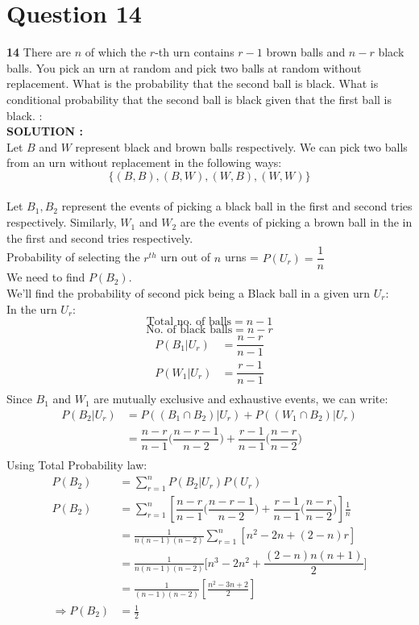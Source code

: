 \documentclass{article}
\begin{document}
\section{Question 14}
\label{Q14}
\textbf{14} There are $n$ of which the $r$-th urn contains $r - 1$ brown balls and $n - r$ black balls. You pick an urn at random and pick two balls at random without replacement. What is the probability that the second ball is black. What is conditional probability that the second ball is black given that the first ball is black.  : \\


\hspace{1em} \large{\textbf{SOLUTION :}} \\
    Let $B$ and $W$ represent black and brown balls respectively.
    We can pick two balls from an urn without replacement in the following ways:\\ 
    $$\{(B,B),(B,W),(W,B),(W,W)\}$$\\
    Let $B_1,B_2$ represent the events of picking a black ball in the first and second tries respectively. Similarly, ${W_1}$ and ${W_2}$ are the events of picking a brown ball in the in the first and second tries respectively.\\
    Probability of selecting the $r^{th}$ urn out of $n$ urns = $P(U_r)=\dfrac{1}{n}$\\
    We need to find $P(B_2)$.\\
    We'll find the probability of second pick being a Black ball in a given urn $U_r$:\\
    In the urn $U_r$:\\
    $$\text{Total no. of balls} = n-1$$
    $$\text{No. of black balls} = n-r$$
\begin{align*}
    P(B_1|U_r)&=\dfrac{n-r}{n-1}\\
    P(W_1|U_r)&=\dfrac{r-1}{n-1}\\
\end{align*}
    Since $B_1$ and $W_1$ are mutually exclusive and exhaustive events, we can write:
\begin{align}
    P(B_2|U_r)&=P((B_1\cap B_2)|U_r) + P((W_1\cap B_2)|U_r)\\
    &=\dfrac{n-r}{n-1}\Big(\dfrac{n-r-1}{n-2}\Big) 
    + \dfrac{r-1}{n-1}\Big(\dfrac{n-r}{n-2}\Big)\\
\end{align}
Using Total Probability law:
\begin{align*}
    P(B_2)&=\sum^n_{r=1}P(B_2|U_r)P(U_r)\\
    P(B_2)&=\sum^n_{r=1}\left[\dfrac{n-r}{n-1}\Big(\dfrac{n-r-1}{n-2}\Big)
    + \dfrac{r-1}{n-1}\Big(\dfrac{n-r}{n-2}\Big)\right]\frac{1}{n}\\
    &=\frac{1}{n(n-1)(n-2)}\sum^n_{r=1}[n^2-2n+(2-n)r]\\
    &=\frac{1}{n(n-1)(n-2)}\Big[n^3-2n^2+\dfrac{(2-n)n(n+1)}{2}\Big]\\
    &=\frac{1}{(n-1)(n-2)}\left[\frac{n^2-3n+2}{2}\right]\\
  \Rightarrow P(B_2) &=\frac{1}{2}
\end{align*}
\end{document}
